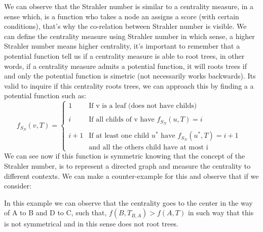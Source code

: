 
We can observe that the Strahler number is similar to a centrality measure, in a sense which, is a function who takes a node an assigns a score (with certain conditions), that's why the co-relation between Strahler number is visible. We can define the centrality measure using Strahler number in which sense, a higher Strahler number means higher centrality, it's important to remember that a potential function tell us if a centrality measure is able to root trees, in other words, if a centrality measure admits a potential function, it will roots trees if and only the potential function is simetric (not necessarily works backwards). Its valid to inquire if this centrality roots trees, we can approach this by finding a a potential function such as:
    \begin{equation}
        f_{S_{N}} (v,T) = \left\{ \begin{array}{llc}
             1 &   \text{If v is a leaf (does not have childs)}  &\\
             \\ i & \text{If all childs of v have $f_{S_{N}} (u,T) = i$} \\
             \\ i + 1 &  \text{If at least one child $u^{
             *}$ have $f_{S_{N}} (u^{*},T) = i+1$} \\
         & \text{and all the others child  have at most i} 
             \end{array}
   \right.
    \end{equation}
We can see now if this function is symmetric knowing that the concept of the Strahler number, is to represent a directed graph and measure the centrality to different contexts. We can make a counter-example for this and observe that if we consider:
\begin{center}
\end{center}

In this example we can observe that the centrality goes to the center in the way of A to B and D to C, such that, $f(B,T_{B,A}) >  f(A,T)$ in such way that this is not symmetrical and in this sense does not root trees.

